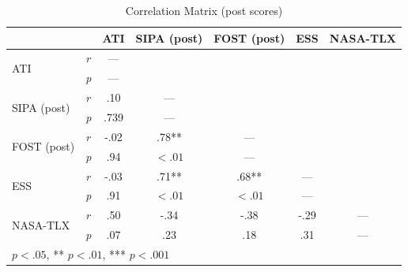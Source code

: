 \documentclass[11pt,a4paper,english]{scrreprt}
\begin{document}
\begin{table}[htbp]
    \centering
    \begin{tabularx}{0.9\textwidth}{ l l c c c c c }
        \toprule
        & & ATI & SIPA (post) & FOST (post) & ESS & NASA-TLX \\
        \midrule
        \multirow[t]{2}{*}{ATI} & \textit{r} & --- & & & & \\
        & \textit{p} & --- & & & & \\
        \multirow[t]{2}{*}{SIPA (post)} & \textit{r} & .10 & --- & & & \\
        & \textit{p} & .739 & --- & & & \\
        \multirow[t]{2}{*}{FOST (post)} & \textit{r} & -.02 & .78** & --- & & \\
        & \textit{p} & .94 & $<.01$ & --- & & \\
        \multirow[t]{2}{*}{ESS} & \textit{r} & -.03 & .71** & .68** & --- & \\
        & \textit{p} & .91 & $<.01$ & $<.01$ & --- & \\
        \multirow[t]{2}{*}{NASA-TLX} & \textit{r} & .50 & -.34 & -.38 & -.29 & --- \\
        & \textit{p} & .07 & .23 & .18 & .31 & --- \\
        \bottomrule
        \multicolumn{7}{l}{\footnotesize * $\textit{p}<.05$, ** $\textit{p}<.01$, *** $\textit{p}<.001$} \\
    \end{tabularx}
    \caption{Correlation Matrix (post scores)}
    \label{table:correlation_matrix_post}
\end{table}
\end{document}

